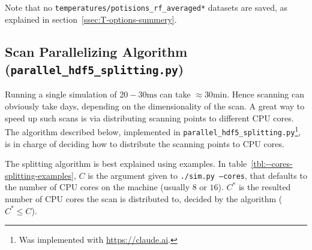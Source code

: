 Note that no \texttt{temperatures/potisions\_rf\_averaged*} datasets are saved, as explained in section~\ref{ssec:T-options-summery}.

\subsection{Scan Parallelizing Algorithm (\texttt{parallel\_hdf5\_splitting.py})}\label{ssec:manual/parallelized-simulating}

Running a single simulation of $20-30\mathrm{ms}$ can take $\approx 30 \mathrm{min}$. Hence scanning can obviously take days, depending on the dimensionality of the scan. A great way to speed up such scans is via distributing scanning points to different CPU cores. The algorithm described below, implemented in \texttt{parallel\_hdf5\_splitting.py}\footnote{Was implemented with \url{https://claude.ai}.}, is in charge of deciding how to distribute the scanning points to CPU cores.

The splitting algorithm is best explained using examples. In table~\ref{tbl:--cores-splitting-examples}, $C$ is the argument given to \texttt{./sim.py --cores}, that defaults to the number of CPU cores on the machine (usually $8$ or $16$). $C^*$ is the resulted number of CPU cores the scan is distributed to, decided by the algorithm ($C^* \leq C$).

